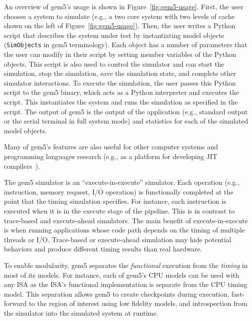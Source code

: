 An overview of gem5's usage is shown in Figure~\ref{fig:gem5-usage}.
First, the user chooses a system to simulate (e.g., a two core system with two levels of cache shown on the left of Figure~\ref{fig:gem5-usage}).
Then, the user writes a Python script that describes the system under test by instantiating model objects (\verb|SimObjects| in gem5 terminology).
Each object has a number of parameters that the user can modify in their script by setting member variables of the Python objects.
This script is also used to control the simulator and can start the simulation, stop the simulation, save the simulation state, and complete other simulator interactions.
To execute the simulation, the user passes this Python script to the gem5 binary, which acts as a Python interpreter and executes the script.
This instantiates the system and runs the simulation as specified in the script.
The output of gem5 is the output of the application (e.g., standard output or the serial terminal in full system mode) and statistics for each of the simulated model objects.

Many of gem5's features are also useful for other computer systems and programming languages research (e.g., as a platform for developing JIT compilers~\cite{Shingarov2015-jit}).

The gem5 simulator is an ``execute-in-execute'' simulator.
Each operation (e.g., instruction, memory request, I/O operation) is functionally completed at the point that the timing simulation specifies.
For instance, each instruction is executed when it is in the execute stage of the pipeline.
This is in contrast to trace-based and execute-ahead simulators.
The main benefit of execute-in-execute is when running applications whose code path depends on the timing of multiple threads or I/O.
Trace-based or execute-ahead simulation may hide potential behaviors and produce different timing results than real hardware.

To enable modularity, gem5 separates the \emph{functional} execution from the \emph{timing} in most of its models.
For instance, each of gem5's CPU models can be used with any ISA as the ISA's functional implementation is separate from the CPU timing model.
This separation allows gem5 to create checkpoints during execution, fast-forward to the region of interest using low fidelity models, and introspection from the simulator into the simulated system at runtime.

